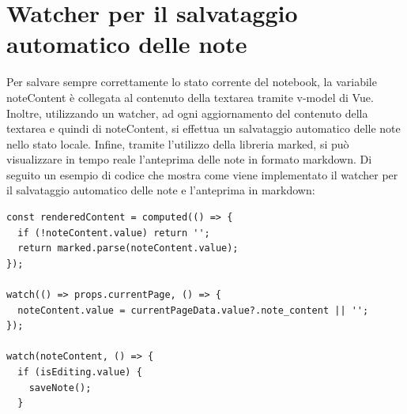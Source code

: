 \section{Watcher per il salvataggio automatico delle note}
Per salvare sempre correttamente lo stato corrente del notebook, la variabile noteContent è collegata al contenuto della textarea tramite v-model di Vue. Inoltre, utilizzando un watcher, ad ogni aggiornamento del contenuto della textarea e quindi di noteContent, si effettua un salvataggio automatico delle note nello stato locale. Infine, tramite l'utilizzo della libreria marked, si può visualizzare in tempo reale l'anteprima delle note in formato markdown. Di seguito un esempio di codice che mostra come viene implementato il watcher per il salvataggio automatico delle note e l'anteprima in markdown:
\begin{lstlisting}[style=javascript, caption=Watcher per il salvataggio automatico delle note e anteprima markdown]
const renderedContent = computed(() => {
  if (!noteContent.value) return '';
  return marked.parse(noteContent.value);
});

watch(() => props.currentPage, () => {
  noteContent.value = currentPageData.value?.note_content || '';
});

watch(noteContent, () => {
  if (isEditing.value) {
    saveNote();
  }
\end{lstlisting}
